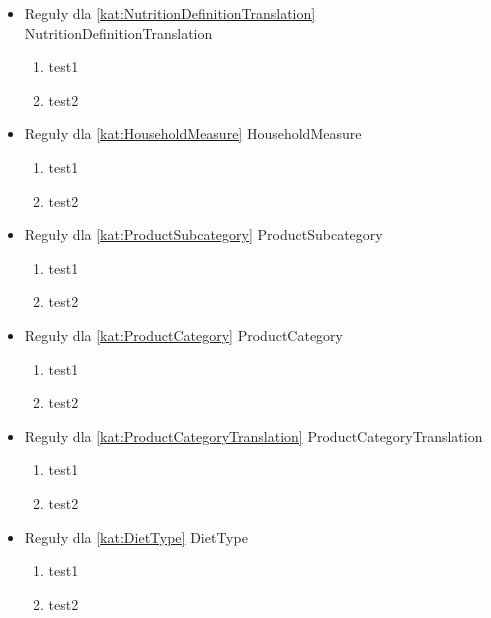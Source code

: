 \begin{itemize}[label={}]
    \item Reguły dla \ref{kat:NutritionDefinitionTranslation} NutritionDefinitionTranslation
    \begin{enumerate}[label={\textbf{REG/\protect\threedigits{\arabic{enumi}}}}, wide, labelwidth=!, resume]
        \item test1
        \item test2
    \end{enumerate}
    \item Reguły dla \ref{kat:HouseholdMeasure} HouseholdMeasure
    \begin{enumerate}[label={\textbf{REG/\protect\threedigits{\arabic{enumi}}}}, wide, labelwidth=!, resume]
        \item test1
        \item test2
    \end{enumerate}
    \item Reguły dla \ref{kat:ProductSubcategory} ProductSubcategory
    \begin{enumerate}[label={\textbf{REG/\protect\threedigits{\arabic{enumi}}}}, wide, labelwidth=!, resume]
        \item test1
        \item test2
    \end{enumerate}
    \item Reguły dla \ref{kat:ProductCategory} ProductCategory
    \begin{enumerate}[label={\textbf{REG/\protect\threedigits{\arabic{enumi}}}}, wide, labelwidth=!, resume]
        \item test1
        \item test2
    \end{enumerate}
    \item Reguły dla \ref{kat:ProductCategoryTranslation} ProductCategoryTranslation
    \begin{enumerate}[label={\textbf{REG/\protect\threedigits{\arabic{enumi}}}}, wide, labelwidth=!, resume]
        \item test1
        \item test2
    \end{enumerate}
    \item Reguły dla \ref{kat:DietType} DietType
    \begin{enumerate}[label={\textbf{REG/\protect\threedigits{\arabic{enumi}}}}, wide, labelwidth=!, resume]
        \item test1
        \item test2
    \end{enumerate}

\end{itemize}
